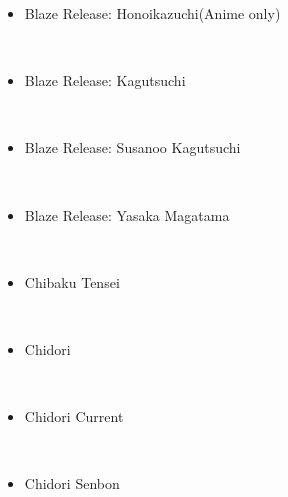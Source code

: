 \documentclass[a4paper,12pt]{article}
\begin{document}
\begin{itemize}
\item Blaze Release: Honoikazuchi(Anime only)
\end{itemize}\\ \par \vspace{0.5cm}

\begin{itemize}
\item Blaze Release: Kagutsuchi
\end{itemize}\\ \par \vspace{0.5cm}

\begin{itemize}
\item Blaze Release: Susanoo Kagutsuchi
\end{itemize}\\ \par \vspace{0.5cm}

\begin{itemize}
\item Blaze Release: Yasaka Magatama
\end{itemize}\\ \par \vspace{0.5cm}

\begin{itemize}
\item Chibaku Tensei
\end{itemize}\\ \par \vspace{0.5cm}

\begin{itemize}
\item Chidori
\end{itemize}\\ \par \vspace{0.5cm}

\begin{itemize}
\item Chidori Current
\end{itemize}\\ \par \vspace{0.5cm}

\begin{itemize}
\item Chidori Senbon
\end{itemize}\\ \par \vspace{0.5cm}
\end{document}
